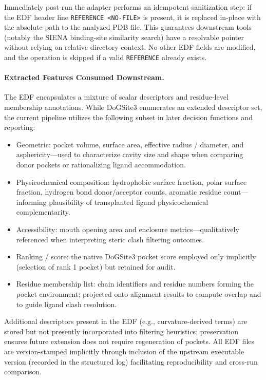 Immediately post-run the adapter performs an idempotent sanitization step: if the EDF header line \texttt{REFERENCE <NO-FILE>} is present, it is replaced in-place with the absolute path to the analyzed PDB file. This guarantees downstream tools (notably the SIENA binding-site similarity search) have a resolvable pointer without relying on relative directory context. No other EDF fields are modified, and the operation is skipped if a valid \texttt{REFERENCE} already exists.

\paragraph{Extracted Features Consumed Downstream.} The EDF encapsulates a mixture of scalar descriptors and residue-level membership annotations. While DoGSite3 enumerates an extended descriptor set, the current pipeline utilizes the following subset in later decision functions and reporting:
\begin{itemize}
    \item Geometric: pocket volume, surface area, effective radius / diameter, and asphericity---used to characterize cavity size and shape when comparing donor pockets or rationalizing ligand accommodation.
    \item Physicochemical composition: hydrophobic surface fraction, polar surface fraction, hydrogen bond donor/acceptor counts, aromatic residue count—informing plausibility of transplanted ligand physicochemical complementarity.
    \item Accessibility: mouth opening area and enclosure metrics—qualitatively referenced when interpreting steric clash filtering outcomes.
    \item Ranking / score: the native DoGSite3 pocket score employed only implicitly (selection of rank 1 pocket) but retained for audit.
    \item Residue membership list: chain identifiers and residue numbers forming the pocket environment; projected onto alignment results to compute overlap and to guide ligand clash resolution.
\end{itemize}
Additional descriptors present in the EDF (e.g., curvature-derived terms) are stored but not presently incorporated into filtering heuristics; preservation ensures future extension does not require regeneration of pockets. All EDF files are version-stamped implicitly through inclusion of the upstream executable version (recorded in the structured log) facilitating reproducibility and cross-run comparison.

